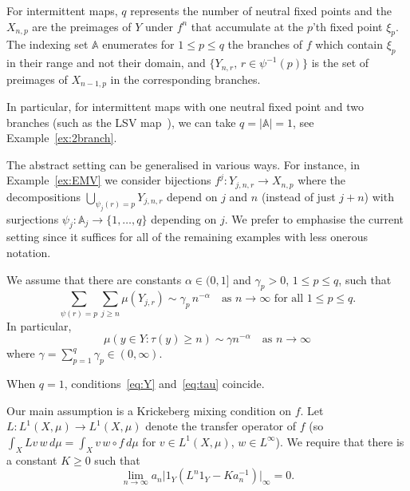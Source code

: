 \documentclass[12pt]{article}
\numberwithin{equation}{section}
\newcommand{\bbA}{{\mathbb A}}
\begin{document}
\begin{rmk} \label{rmk:p}
For intermittent maps, $q$ represents the number
  of neutral fixed points and the $X_{ n,p }$ are the preimages of $Y$
  under $f^n$ that accumulate at the $p$'th fixed point $\xi_p$. The indexing set
  $\mathbb{A}$ enumerates for $1\le p\le q$ the branches of $f$ which contain $\xi_p$ in their range and not their domain, and
  $\{Y_{ n,r },\, r\in\psi^{-1}(p)\}$ is the set of preimages of $X_{n - 1,p}$ in the corresponding branches. 

In particular, for
intermittent maps with one neutral fixed point and two branches (such as the LSV map~\cite{LSV99}), we can take $q=|\bbA|=1$, see Example~\ref{ex:2branch}.

The abstract setting can be generalised in various ways. For instance, in Example~\ref{ex:EMV} we consider bijections $f^j:Y_{j,n,r}\to X_{n,p}$ where the decompositions $\bigcup_{\psi_j(r)=p}Y_{j,n,r}$ depend on $j$ and $n$ (instead of just $j+n$) with surjections $\psi_j:\bbA_j\to\{1,\dots,q\}$ depending on $j$. We prefer to emphasise the current setting since it suffices for all of the remaining examples with less onerous notation.
\end{rmk}

We assume that there are constants $\alpha\in(0,1]$
and $\gamma_p>0$, $1\le p\le q$, 
 such that
\begin{equation} \label{eq:Y}
\sum_{\psi(r)=p}\sum_{j\ge n}\mu(Y_{j,r}) \sim \gamma_p \, n^{-\alpha}
\quad\text{as $n\to\infty$ for all $1\le p\le q$.}
\end{equation}
In particular,
\begin{equation} \label{eq:tau}
\mu(y\in Y:\tau(y)\ge n) \sim \gamma n^{-\alpha}
\quad\text{as $n\to\infty$}
\end{equation}
where $\gamma=\sum_{p=1}^q\gamma_p\in(0,\infty)$.

\begin{rmk}
When $q=1$, conditions~\eqref{eq:Y} and~\eqref{eq:tau} coincide.
\end{rmk}

Our main assumption is a Krickeberg mixing condition on $f$.
Let $L:L^1(X,\mu)\to L^1(X,\mu)$ denote the transfer operator of $f$
(so $\int_X Lv\,w\,d\mu=\int_X v\,w\circ f\,d\mu$ for
$v\in L^1(X,\mu)$, $w\in L^\infty$).
We require that there is a constant $K\ge0$ such that
\begin{equation} \label{eq:K}
	\lim_{n\to\infty}a_n\big|1_Y(L^n1_Y-Ka_n^{-1})\big|_\infty =0.
\end{equation}
\end{document}
